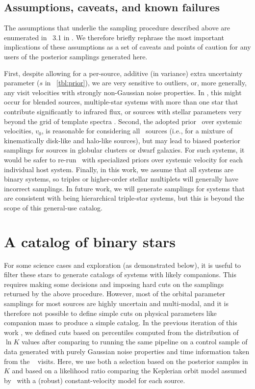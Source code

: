 \documentclass[modern]{aastex63}
\begin{document}
\subsection{Assumptions, caveats, and known failures}
\label{sec:caveats}

The assumptions that underlie the sampling procedure described above are
enumerated in \sectionname~3.1 in \cite{Price-Whelan:2018}.
We therefore briefly rephrase the most important implications of these
assumptions as a set of caveats and points of caution for any users of the
posterior samplings generated here.

First, despite allowing for a per-source, additive (in variance) extra
uncertainty parameter ($s$ in \tablename~\ref{tbl:prior}), we are very sensitive
to outliers, or, more generally, any visit velocities with strongly non-Gaussian
noise properties.
In \apogee, this might occur for blended sources, multiple-star systems with
more than one star that contribute significantly to infrared flux, or sources
with stellar parameters very beyond the grid of template spectra
\citep{Nidever:2015}.
Second, the adopted prior \pdf\ over systemic velocities, $v_0$, is reasonable
for considering all \apogee\ sources (i.e., for a mixture of kinematically
disk-like and halo-like sources), but may lead to biased posterior samplings for
sources in globular clusters or dwarf galaxies.
For such systems, it would be safer to re-run \thejoker\ with specialized priors
over systemic velocity for each individual host system.
Finally, in this work, we assume that all systems are binary systems, so triples
or higher-order stellar multiplets will generally have incorrect samplings.
In future work, we will generate samplings for systems that are consistent with
being hierarchical triple-star systems, but this is beyond the scope of this
general-use catalog.


\section{A catalog of binary stars} \label{sec:catalog}

For some science cases and exploration (as demonstrated below), it is useful to
filter these stars to generate catalogs of systems with likely companions.
This requires making some decisions and imposing hard cuts on the samplings
returned by the above procedure.
However, most of the orbital parameter samplings for most sources are highly
uncertain and multi-modal, and it is therefore not possible to define simple
cuts on physical parameters like companion mass to produce a simple catalog.
In the previous iteration of this work \citep{Price-Whelan:2018}, we defined
cuts based on percentiles computed from the distribution of $\ln K$ values after
comparing to running the same pipeline on a control sample of data generated
with purely Gaussian noise properties and time information taken from the
\apogee\  visits.
Here, we use both a selection based on the posterior samples in $K$ and based on
a likelihood ratio comparing the Keplerian orbit model assumed by \thejoker\
with a (robust) constant-velocity model for each source.
\end{document}
